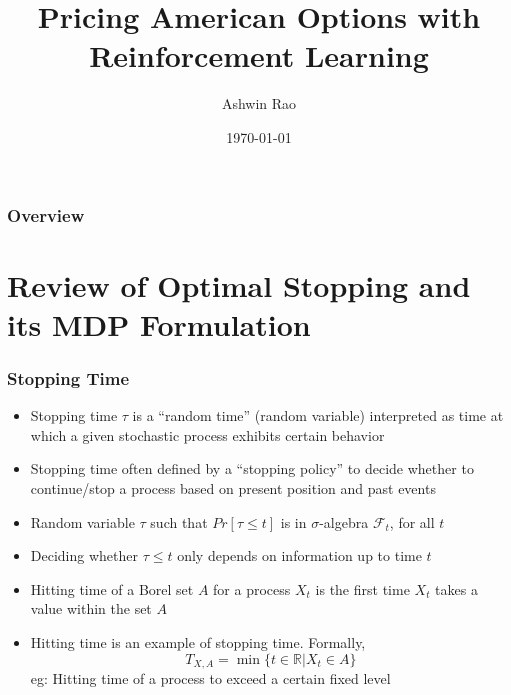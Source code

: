 \documentclass[handout]{beamer}
\title[RL for American Options]{Pricing American Options with Reinforcement Learning} %
\author{Ashwin Rao} %
\institute[Stanford] %
{
ICME, Stanford University
}
\date{\today} %
\begin{document}
\begin{frame}
\titlepage %
\end{frame}

\begin{frame}
\frametitle{Overview} %
\tableofcontents %
\end{frame}

\section{Review of Optimal Stopping and its MDP Formulation}

\begin{frame}
\frametitle{Stopping Time}
\pause
\begin{itemize}[<+->]
\item Stopping time $\tau$ is a ``random time'' (random variable) interpreted as time at which a given stochastic process exhibits certain behavior
\item Stopping time often defined by a ``stopping policy'' to decide whether to continue/stop a process based on present position and past events
\item Random variable $\tau$ such that $Pr[\tau \leq t]$ is in $\sigma$-algebra $\mathcal{F}_t$, for all $t$
\item Deciding whether $\tau \leq t$ only depends on information up to time $t$
\item Hitting time of a Borel set $A$ for a process $X_t$ is the first time $X_t$ takes a value within the set $A$
\item Hitting time is an example of stopping time. Formally, 
$$T_{X,A} = \min \{t \in \mathbb{R} | X_t \in A\}$$
eg: Hitting time of a process to exceed a certain fixed level
\end{itemize}
\end{frame}
\end{document}
